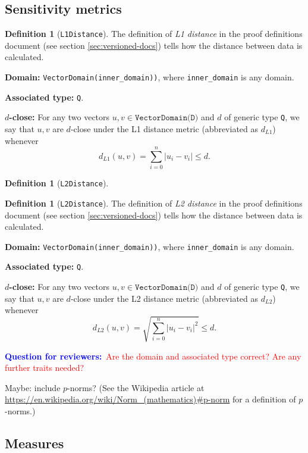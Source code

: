 \documentclass[11pt,a4paper]{article}
\theoremstyle{definition}
\newtheorem{definition}[theorem]{Definition}
\newcommand{\metricDefn}[1]{The definition of \emph{#1} in the proof definitions document (see section \ref{sec:versioned-docs}) tells how the distance between data is calculated.}
\newcommand{\questionr}[1]{\textcolor{blue}{\textbf{Question for reviewers:}}\textcolor{red}{~#1}}
\begin{document}
\subsection{Sensitivity metrics}


\begin{definition}[\texttt{L1Distance}]
    \metricDefn{L1 distance}
    \item \textbf{Domain:} \texttt{VectorDomain(inner\_domain))}, where \texttt{inner\_domain} is any domain.
    \item \textbf{Associated type:} \texttt{Q}.
    \item \textbf{$d$-close:} For any two vectors $u, v \in \texttt{VectorDomain(D)}$ and $d$ of generic type \texttt{Q}, we say that $u, v$ are $d$-close under the L1 distance metric (abbreviated as $d_{L1}$) whenever
    \[
        d_{L1}(u, v) = \sum_{i=0}^n |u_i - v_i| \leq d.
    \]
\end{definition}

\begin{definition}[\texttt{L2Distance}]
    \begin{definition}[\texttt{L2Distance}]
    \metricDefn{L2 distance}
    \item \textbf{Domain:} \texttt{VectorDomain(inner\_domain))}, where \texttt{inner\_domain} is any domain.
    \item \textbf{Associated type:} \texttt{Q}.
    \item \textbf{$d$-close:} For any two vectors $u, v \in \texttt{VectorDomain(D)}$ and $d$ of generic type \texttt{Q}, we say that $u, v$ are $d$-close under the L2 distance metric (abbreviated as $d_{L2}$) whenever
    \[
        d_{L2}(u, v) = \sqrt{\sum_{i=0}^n |u_i - v_i|^2} \leq d.
    \]
\end{definition}
\end{definition}

\questionr{Are the domain and associated type correct? Are any further traits needed?}

Maybe: include $p$-norms? (See the Wikipedia article at \url{https://en.wikipedia.org/wiki/Norm_(mathematics)\#p-norm} for a definition of $p$-norms.)

\subsection{Measures}
\end{document}
